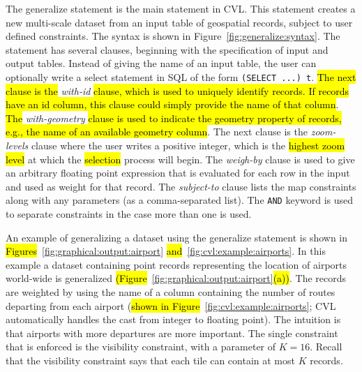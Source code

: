 The generalize statement is the main statement in CVL. This statement creates a new multi-scale dataset from an input table of geospatial records, subject to user defined constraints. The syntax is shown in Figure~\ref{fig:generalize:syntax}. The statement has several clauses, beginning with the specification of input and output tables. Instead of giving the name of an input table, the user can optionally write a select statement in SQL of the form \texttt{(SELECT ...) t}. \hl{The next clause is the }\emph{with-id}\hl{ clause, which is used to uniquely identify records. If records have an id column, this clause could simply provide the name of that column}. \hl{The }\emph{with-geometry}\hl{ clause is used to indicate the geometry property of records, e.g., the name of an available geometry column}. The next clause is the \emph{zoom-levels} clause where the user writes a positive integer, which is the \hl{highest zoom level} at which the \hl{selection} process will begin. The \emph{weigh-by} clause is used to give an arbitrary floating point expression that is evaluated for each row in the input and used as weight for that record. The \emph{subject-to} clause lists the map constraints along with any parameters (as a comma-separated list). The \texttt{AND} keyword is used to separate constraints in the case more than one is used.



An example of generalizing a dataset using the generalize statement is shown in \hl{Figures}~\ref{fig:graphical:output:airport}\hl{ and}~\ref{fig:cvl:example:airports}. In this example a dataset containing point records representing the location of airports world-wide is generalized \hl{(Figure}~\ref{fig:graphical:output:airport}\hl{(a))}. The records are weighted by using the name of a column containing the number of routes departing from each airport (\hl{shown in Figure}~\ref{fig:cvl:example:airports}; CVL automatically handles the cast from integer to floating point). The intuition is that airports with more departures are more important. The single constraint that is enforced is the visibility constraint, with a parameter of $K=16$. Recall that the visibility constraint says that each tile can contain at most $K$ records.


